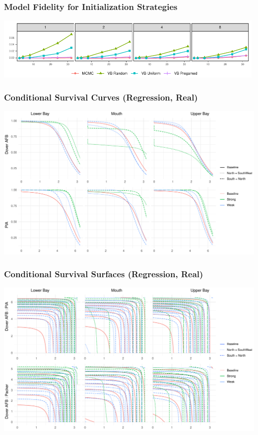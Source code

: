 \documentclass[aspectratio=169,10pt]{beamer}
\newlength{\frametextheight}
\begin{document}
\begin{frame}
    \frametitle{Model Fidelity for Initialization Strategies}
    \begin{center}
    \includegraphics[width = 0.99\textwidth]{./ch3/plots/energy_score}
    \end{center}
\end{frame} %


\begin{frame}
    \frametitle{Conditional Survival Curves (Regression, Real)}
    \begin{center}
        \includegraphics[height=0.99\frametextheight]{./ch3/plots/condsurv_reg/condsurv_reg_1d_real}
    \end{center}
\end{frame}

\begin{frame}
    \frametitle{Conditional Survival Surfaces (Regression, Real)}
    \begin{center}
        \includegraphics[height=0.99\frametextheight]{./ch3/plots/condsurv_reg/condsurv_reg_2d_real}
    \end{center}
\end{frame}
\end{document}
